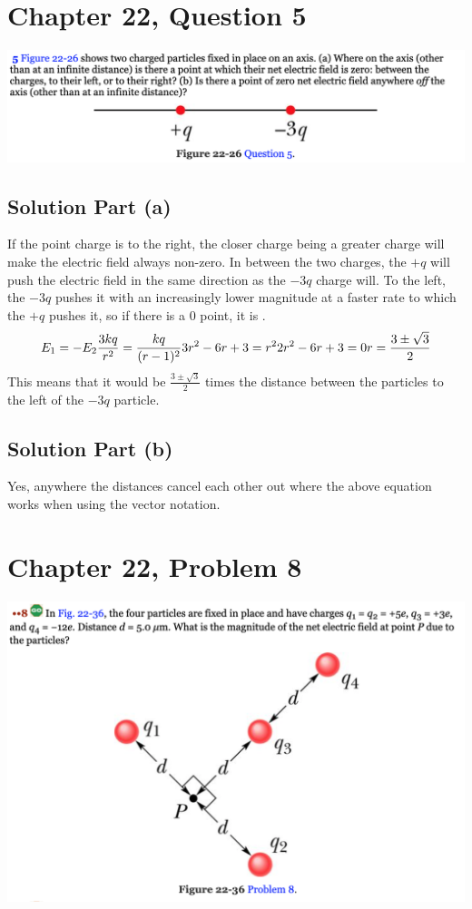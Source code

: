 \documentclass[12pt]{article}
\begin{document}
\pagebreak
\section*{Chapter 22, Question 5}
\includegraphics[width=\textwidth]{picture_4.png}

\subsection*{Solution Part (a)}
If the point charge is to the right, the closer charge being a greater charge will make the electric field always non-zero. In between the two charges, the $+q$ will push the electric field in the same direction as the $-3q$ charge will. To the left, the $-3q$ pushes it with an increasingly lower magnitude at a faster rate to which the $+q$ pushes it, so if there is a 0 point, it is .
\begin{equation*}
    E_1 = -E_2\\
    \frac{3kq}{r^2} = \frac{kq}{(r - 1)^2}\\
    3r^2 - 6r + 3 = r^2\\
    2r^2 - 6r + 3 = 0\\
    r = \frac{3 \pm \sqrt{3}}{2}
\end{equation*}
This means that it would be $\frac{3 \pm \sqrt{3}}{2}$ times the distance between the particles to the left of the $-3q$ particle.

\subsection*{Solution Part (b)}
Yes, anywhere the distances cancel each other out where the above equation works when using the vector notation.

\pagebreak
\section*{Chapter 22, Problem 8}
\includegraphics[width=\textwidth]{picture_5.png}
\end{document}
